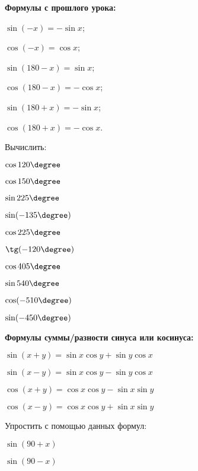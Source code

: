%
%
\begin{class}[number=2]
	\begin{listofex}
		\item \textbf{Формулы с прошлого урока:}
		\begin{enumcols}[itemcolumns=3]
			\item \( \sin(-x) = -\sin x \);
			\item \( \cos(-x) = \cos x \);
			\item \( \sin(180 - x) = \sin x \);
			\item \( \cos(180 - x) = -\cos x \);
			\item \( \sin(180+x) = -\sin x \);
			\item \( \cos(180+x) = -\cos x \).
		\end{enumcols}
		\item Вычислить:
		\begin{enumcols}[itemcolumns=5]
			\item \( \cos120\degree \)
			\item \( \cos150\degree \)
			\item \( \sin225\degree \)
			\item \( \sin(-135\degree )\)
			\item \( \cos225\degree \)
			\item \( \tg(-120\degree) \)
			\item \( \cos405\degree \)
			\item \( \sin540\degree \)
			\item \( \cos(-510\degree) \)
			\item \( \sin(-450\degree) \)
		\end{enumcols}
		\item \textbf{Формулы суммы/разности синуса или косинуса:}
		\begin{enumcols}[itemcolumns=2]
			\item \( \sin(x+y)=\sin x\cos y + \sin y \cos x \)
			\item \( \sin(x-y)=\sin x\cos y - \sin y \cos x \)
			\item \( \cos(x+y)=\cos x \cos y - \sin x \sin y \)
			\item \( \cos(x-y)=\cos x \cos y + \sin x \sin y \)
		\end{enumcols}
		\item Упростить с помощью данных формул:
		\begin{enumcols}[itemcolumns=4]
			\item \( \sin(90+x)\)
			\item \( \sin(90-x)\)

\end{enumcols}
\end{listofex}
\end{class}
